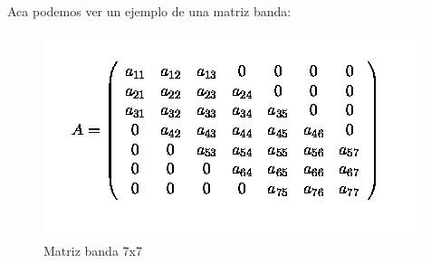 Aca podemos ver un ejemplo de una matriz banda:

\begin{figure}[htb]
\begin{center}
\includegraphics[scale=0.70]{imagenes/matriz_banda.jpg} 
\caption{Matriz banda 7x7} 
\end{center}
\end{figure}







